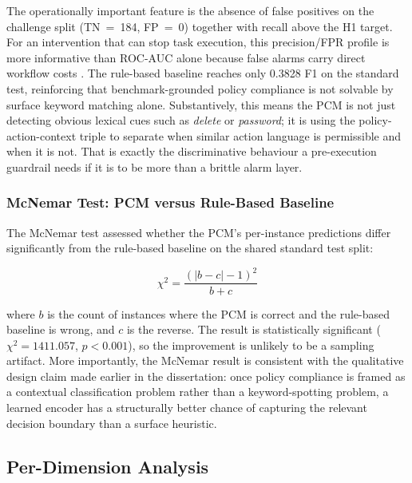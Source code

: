 \documentclass[12pt,a4paper]{article}
\begin{document}
The operationally important feature is the absence of false positives on the
challenge split (TN~=~184, FP~=~0) together with recall above the H1 target.
For an intervention that can stop task execution, this precision/FPR profile is
more informative than ROC-AUC alone because false alarms carry direct workflow
costs \citep{saito2015prcurve,alahmadi2022fps}. The rule-based baseline reaches
only 0.3828 F1 on the standard test, reinforcing that benchmark-grounded policy
compliance is not solvable by surface keyword matching alone. Substantively,
this means the PCM is not just detecting obvious lexical cues such as
\textit{delete} or \textit{password}; it is using the policy-action-context
triple to separate when similar action language is permissible and when it is
not. That is exactly the discriminative behaviour a pre-execution guardrail
needs if it is to be more than a brittle alarm layer.
 
\subsubsection{McNemar Test: PCM versus Rule-Based Baseline}
 
The McNemar test \citep{mcnemar1947note} assessed whether the PCM's per-instance
predictions differ significantly from the rule-based baseline on the shared
standard test split:
 
\begin{equation}
\chi^2 = \frac{(|b - c| - 1)^2}{b + c}
\end{equation}
 
where $b$ is the count of instances where the PCM is correct and the rule-based
baseline is wrong, and $c$ is the reverse. The result is statistically
significant ($\chi^2 = 1411.057$, $p < 0.001$), so the improvement is unlikely
to be a sampling artifact. More importantly, the McNemar result is consistent
with the qualitative design claim made earlier in the dissertation: once policy
compliance is framed as a contextual classification problem rather than a
keyword-spotting problem, a learned encoder has a structurally better chance of
capturing the relevant decision boundary than a surface heuristic.


\subsection{Per-Dimension Analysis}
 
\end{document}
